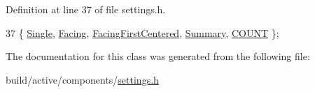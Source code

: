Definition at line 37 of file settings.\+h.


\begin{DoxyCode}
37 \{ \hyperlink{classOkular_1_1Settings_1_1EnumViewMode_a33bc89b0f0c02bd5539bad916569a665a7ae89daa45516a7920bf5ee4f15c8d27}{Single}, \hyperlink{classOkular_1_1Settings_1_1EnumViewMode_a33bc89b0f0c02bd5539bad916569a665ad6ce5fe491499be5fc070b0364e24287}{Facing}, \hyperlink{classOkular_1_1Settings_1_1EnumViewMode_a33bc89b0f0c02bd5539bad916569a665a9c6afefcdc8d9a813c22e4492a8eecfb}{FacingFirstCentered}, \hyperlink{classOkular_1_1Settings_1_1EnumViewMode_a33bc89b0f0c02bd5539bad916569a665a6551656e4f96799c3792390290c061fb}{Summary}, 
      \hyperlink{classOkular_1_1Settings_1_1EnumViewMode_a33bc89b0f0c02bd5539bad916569a665a64c8d46060705f0b7f399a65a41a9782}{COUNT} \};
\end{DoxyCode}


The documentation for this class was generated from the following file\+:\begin{DoxyCompactItemize}
\item 
build/active/components/\hyperlink{active_2components_2settings_8h}{settings.\+h}\end{DoxyCompactItemize}
